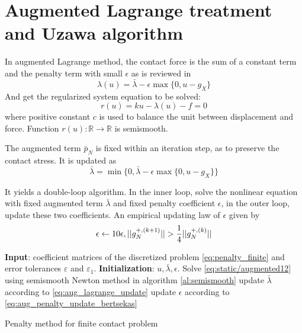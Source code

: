 \documentclass[fleqn,12pt,letter]{reportY}
\numberwithin{figure}{chapter}
\begin{document}
\section{Augmented Lagrange treatment and Uzawa algorithm}
In augmented Lagrange method, the contact force is the sum of a constant term and the penalty term with small $\epsilon$ as is reviewed in \cite{wriggers2006computational}
\begin{equation}\label{eq:static/augmented11}
\lambda(u) = \bar{\lambda} - \epsilon \max\{ 0, u-g_X\}
\end{equation}
And get the regularized system equation to be solved: 
\begin{equation}\label{eq:static/augmented12}
r(u) = ku-\lambda(u) -f = 0
\end{equation}
where positive constant $c$ is used to balance the unit between displacement and force. Function $r(u): \mathbb R \rightarrow \mathbb R $ is semismooth. 

The augmented term $\bar{p}_N$ is fixed within an iteration step, as to preserve the contact stress. It is updated as 
\begin{equation}\label{eq:aug_lagrange_update}
\bar{\lambda}= \min \{ 0, \bar{\lambda} - \epsilon \max\{ 0, u-g_X\} \}
\end{equation}

It yields a double-loop algorithm. In the inner loop, solve the nonlinear equation with fixed augmented term $\bar{\lambda}$ and fixed penalty coefficient $\epsilon$, in the outer loop, update these two coefficients. An empirical updating law of $\epsilon$ given by \cite{bertsekas2014constrained}
\begin{equation}\label{eq:aug_penalty_update_bertsekas}
\epsilon \leftarrow
10\epsilon
,\\
||g_N^{+,(k+1)}|| > \frac{1}{4} ||g_N^{+,(k)}|| 
\end{equation}

\begin{algo}
\begin{algobox}
\begin{algorithmic}[1]%
\STATE \textbf{Input}: coefficient matrices of the discretized problem \eqref{eq:penalty_finite} and error tolerances $\varepsilon$ and $\varepsilon_1$.
\STATE \textbf{Initialization}: $u, \bar{\lambda}, \epsilon$. 
		\STATE Solve \eqref{eq:static/augmented12} using semismooth Newton method in algorithm \ref{al:semismooth}
	\ENDWHILE
	\STATE update $ \bar{\lambda}$ according to \eqref{eq:aug_lagrange_update} 
	\STATE update $\epsilon$ according to \eqref{eq:aug_penalty_update_bertsekas}
\ENDWHILE
\end{algorithmic}
\end{algobox}
\caption{Penalty method for finite contact problem}\label{al:static/augmented}
\end{algo}
\end{document}
